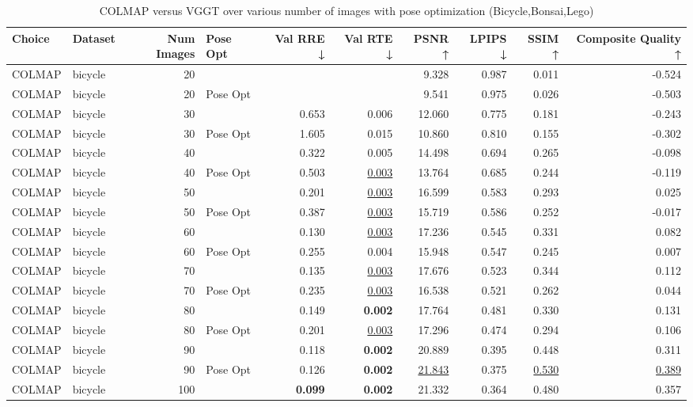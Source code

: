 \begin{table}[H]
\caption{COLMAP versus VGGT over various number of images with pose optimization (Bicycle,Bonsai,Lego)}
\label{tab:01_num_images_pose_opt_bicycle,bonsai,lego}
\small
\begin{tabular}{llrlrrrrrr}
\toprule
Choice & Dataset & Num Images & Pose Opt & Val RRE ↓ & Val RTE ↓ & PSNR ↑ & LPIPS ↓ & SSIM ↑ & Composite Quality ↑ \\
\midrule
COLMAP & bicycle & 20 &  &  &  & 9.328 & 0.987 & 0.011 & -0.524 \\
COLMAP & bicycle & 20 & Pose Opt &  &  & 9.541 & 0.975 & 0.026 & -0.503 \\
COLMAP & bicycle & 30 &  & 0.653 & 0.006 & 12.060 & 0.775 & 0.181 & -0.243 \\
COLMAP & bicycle & 30 & Pose Opt & 1.605 & 0.015 & 10.860 & 0.810 & 0.155 & -0.302 \\
COLMAP & bicycle & 40 &  & 0.322 & 0.005 & 14.498 & 0.694 & 0.265 & -0.098 \\
COLMAP & bicycle & 40 & Pose Opt & 0.503 & \underline{0.003} & 13.764 & 0.685 & 0.244 & -0.119 \\
COLMAP & bicycle & 50 &  & 0.201 & \underline{0.003} & 16.599 & 0.583 & 0.293 & 0.025 \\
COLMAP & bicycle & 50 & Pose Opt & 0.387 & \underline{0.003} & 15.719 & 0.586 & 0.252 & -0.017 \\
COLMAP & bicycle & 60 &  & 0.130 & \underline{0.003} & 17.236 & 0.545 & 0.331 & 0.082 \\
COLMAP & bicycle & 60 & Pose Opt & 0.255 & 0.004 & 15.948 & 0.547 & 0.245 & 0.007 \\
COLMAP & bicycle & 70 &  & 0.135 & \underline{0.003} & 17.676 & 0.523 & 0.344 & 0.112 \\
COLMAP & bicycle & 70 & Pose Opt & 0.235 & \underline{0.003} & 16.538 & 0.521 & 0.262 & 0.044 \\
COLMAP & bicycle & 80 &  & 0.149 & \textbf{0.002} & 17.764 & 0.481 & 0.330 & 0.131 \\
COLMAP & bicycle & 80 & Pose Opt & 0.201 & \underline{0.003} & 17.296 & 0.474 & 0.294 & 0.106 \\
COLMAP & bicycle & 90 &  & 0.118 & \textbf{0.002} & 20.889 & 0.395 & 0.448 & 0.311 \\
COLMAP & bicycle & 90 & Pose Opt & 0.126 & \textbf{0.002} & \underline{21.843} & 0.375 & \underline{0.530} & \underline{0.389} \\
COLMAP & bicycle & 100 &  & \textbf{0.099} & \textbf{0.002} & 21.332 & 0.364 & 0.480 & 0.357 \\

\end{tabular}
\end{table}
